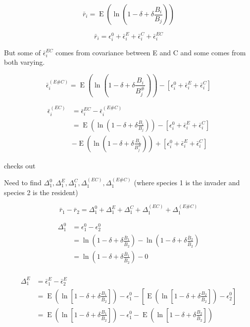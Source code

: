 \documentclass[letterpaper,11pt]{article}
\DeclareMathOperator{\EX}{E}%
\begin{document}
\begin{equation}
\bar r_i=\EX(\ln(1-\delta + \delta \frac{B_i}{B_j}))\label{rbari}
\end{equation}

\begin{equation}
\bar r_i=\epsilon_i^0 +\bar \epsilon_i^E + \bar \epsilon_i^C + \bar \epsilon_i^{EC} \label{rbari_decomp}
\end{equation}

But some of $\bar \epsilon_i^{EC}$ comes from covariance between E and C and some comes from both varying.

\begin{equation}
\bar \epsilon_i^{(E\#C)}=\EX(\ln(1-\delta + \delta \frac{B_i}{B_j^{\#}})) -[\epsilon_i^0 +\bar \epsilon_i^E + \bar \epsilon_i^C] \label{ECvar_sharp}
\end{equation}

\begin{align}
\bar \epsilon_i^{(EC)}&=\bar \epsilon_i^{EC}-\bar \epsilon_i^{(E\#C)}\\
&= \EX(\ln(1-\delta + \delta \frac{B_i}{B_j}))-[\epsilon_i^0 +\bar \epsilon_i^E + \bar \epsilon_i^C]\\
&- \EX(\ln(1-\delta + \delta \frac{B_i}{B_j^{\#}})) +[\epsilon_i^0 +\bar \epsilon_i^E + \bar \epsilon_i^C]
\label{r_iSE}
\end{align}

checks out

Need to find $\Delta_1^0, \Delta_1^E, \Delta_1^C, \Delta_1^{(EC)}, \Delta_1^{(E\#C)}$ (where species 1 is the invader and species 2 is the resident)

\begin{equation}
\bar r_1-\bar r_2 = \Delta_1^0+\Delta_1^E+\Delta_1^C+\Delta_1^{(EC)}+\Delta_1^{(E\#C)} 
\end{equation}

\begin{align}
\Delta_1^0 &= \epsilon_1^0 - \epsilon_2^0\\
&=\ln(1-\delta + \delta \frac{\bar B_1}{\bar B_2}) - \ln(1-\delta + \delta \frac{\bar B_2}{\bar B_2})\\
&=\ln(1-\delta + \delta \frac{\bar B_1}{\bar B_2}) - 0 \\
\end{align}

\begin{align}
\Delta_1^E &= \bar \epsilon_1^E - \bar \epsilon_2^E\\
&=\EX (\ln[1-\delta + \delta \frac{B_1}{\bar B_2}]) - \epsilon_1^0 - [\EX(\ln[1-\delta + \delta \frac{ B_2}{\bar B_2}]) - \epsilon_2^0]\\
&=\EX (\ln[1-\delta + \delta \frac{B_1}{\bar B_2}]) - \epsilon_1^0 - \EX(\ln[1-\delta + \delta \frac{ B_2}{\bar B_2}]) \\
\end{align}
\end{document}

